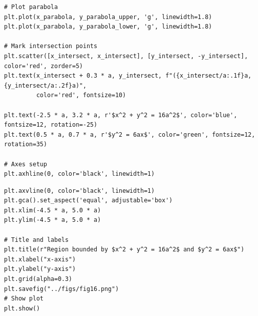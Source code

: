 \documentclass{beamer}
\theoremstyle{remark}
\numberwithin{equation}{section}
\begin{document}
\begin{frame}[fragile]
\begin{lstlisting}
# Plot parabola
plt.plot(x_parabola, y_parabola_upper, 'g', linewidth=1.8)
plt.plot(x_parabola, y_parabola_lower, 'g', linewidth=1.8)

# Mark intersection points
plt.scatter([x_intersect, x_intersect], [y_intersect, -y_intersect], color='red', zorder=5)
plt.text(x_intersect + 0.3 * a, y_intersect, f"({x_intersect/a:.1f}a, {y_intersect/a:.2f}a)",
         color='red', fontsize=10)

plt.text(-2.5 * a, 3.2 * a, r'$x^2 + y^2 = 16a^2$', color='blue', fontsize=12, rotation=-25)
plt.text(0.5 * a, 0.7 * a, r'$y^2 = 6ax$', color='green', fontsize=12, rotation=35)

# Axes setup
plt.axhline(0, color='black', linewidth=1)
\end{lstlisting}
\end{frame}
\begin{frame}[fragile]
\begin{lstlisting}
plt.axvline(0, color='black', linewidth=1)
plt.gca().set_aspect('equal', adjustable='box')
plt.xlim(-4.5 * a, 5.0 * a)
plt.ylim(-4.5 * a, 5.0 * a)

# Title and labels
plt.title(r"Region bounded by $x^2 + y^2 = 16a^2$ and $y^2 = 6ax$")
plt.xlabel("x-axis")
plt.ylabel("y-axis")
plt.grid(alpha=0.3)
plt.savefig("../figs/fig16.png")
# Show plot
plt.show()

\end{lstlisting}
\end{frame}
\end{document}
